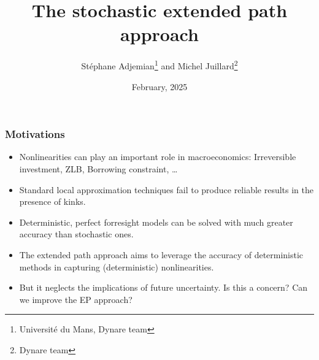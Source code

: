 \documentclass{beamer}
\begin{document}


\title{The stochastic extended path approach}
\author{St\'ephane Adjemian\footnote{Universit\'e du Mans, Dynare team} and Michel Juillard\footnote{Dynare team}}
\date{February, 2025}

\begin{frame}
   \titlepage{}
\end{frame}


\begin{frame}
   \frametitle{Motivations}

   \begin{itemize}

      \item Nonlinearities can play an important role in macroeconomics:
            Irreversible investment, ZLB, Borrowing constraint, \ldots\newline

      \item Standard local approximation techniques fail to produce
            reliable results in the presence of kinks.\newline

      \item Deterministic, perfect forresight models can be solved with much
            greater accuracy than stochastic ones.\newline

      \item The extended path approach aims to leverage the accuracy of
            deterministic methods in capturing (deterministic) nonlinearities.\newline

      \item But it neglects the implications of future uncertainty. Is
            this a concern? Can we improve the EP approach?

   \end{itemize}
\end{frame}
\end{document}
